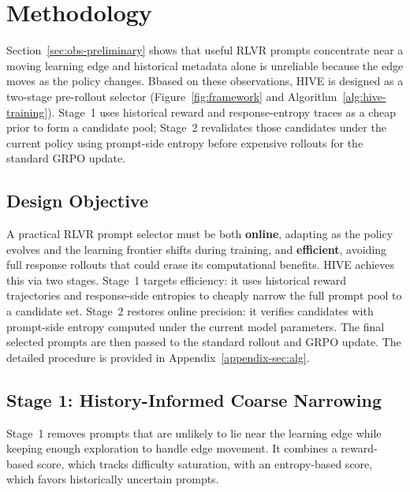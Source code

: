 \section{Methodology}
\label{sec:method}
\begingroup
\setlength{\abovedisplayskip}{5pt plus 1pt minus 1pt}
\setlength{\belowdisplayskip}{5pt plus 1pt minus 1pt}
\setlength{\abovedisplayshortskip}{3pt plus 1pt minus 1pt}
\setlength{\belowdisplayshortskip}{3pt plus 1pt minus 1pt}
Section~\ref{sec:obs-preliminary} shows that useful RLVR prompts concentrate near a moving learning edge and historical metadata alone is unreliable because the edge moves as the policy changes. Bbased on these observations, HIVE is designed as a two-stage pre-rollout selector (Figure~\ref{fig:framework} and Algorithm~\ref{alg:hive-training}). Stage~1 uses historical reward and response-entropy traces as a cheap prior to form a candidate pool; Stage~2 revalidates those candidates under the current policy using prompt-side entropy before expensive rollouts for the standard GRPO update.

\subsection{Design Objective}
A practical RLVR prompt selector must be both \textbf{online}, adapting as the policy evolves and the learning frontier shifts during training, and \textbf{efficient}, avoiding full response rollouts that could erase its computational benefits. HIVE achieves this via two stages. Stage~1 targets efficiency: it uses historical reward trajectories and response-side entropies to cheaply narrow the full prompt pool to a candidate set. Stage~2 restores online precision: it verifies candidates with prompt-side entropy computed under the current model parameters. The final selected prompts are then passed to the standard rollout and GRPO update. The detailed procedure is provided in Appendix~\ref{appendix-sec:alg}.

\subsection{Stage 1: History-Informed Coarse Narrowing}
Stage~1 removes prompts that are unlikely to lie near the learning edge while keeping enough exploration to handle edge movement. It combines a reward-based score, which tracks difficulty saturation, with an entropy-based score, which favors historically uncertain prompts.

